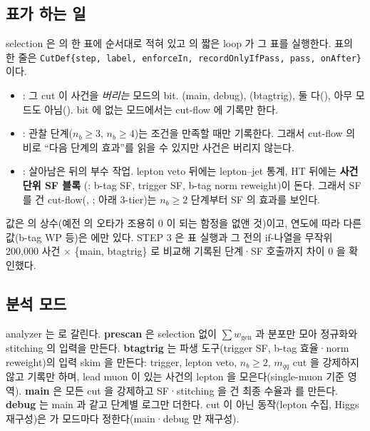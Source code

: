 \subsection{표가 하는 일}
selection 은  의  한 표에 순서대로 적혀 있고  의 짧은 loop 가 그 표를
실행한다. 표의 한 줄은 \texttt{CutDef\{step, label, enforceIn, recordOnlyIfPass, pass, onAfter\}} 이다.
\begin{itemize}
\item {}: 그 cut 이 사건을 \emph{버리는} 모드의 bit. (main, debug), (btagtrig),
      둘 다(), 아무 모드도 아님(). bit 에 없는 모드에서는 cut-flow 에 기록만 한다.
\item {}: 관찰 단계($n_b\ge3$, $n_b\ge4$)는 조건을 만족할 때만 기록한다. 그래서 cut-flow 의 비로 ``다음 단계의 효과''를
      읽을 수 있지만 사건은 버리지 않는다.
\item {}: 살아남은 뒤의 부수 작업. lepton veto 뒤에는 lepton–jet 통계, HT 뒤에는 \textbf{사건 단위 SF 블록}
      (: b-tag SF, trigger SF, b-tag norm reweight)이 돈다. 그래서 SF 를 건 cut-flow(, ; 아래 3-tier)는
      $n_b\ge2$ 단계부터 SF 의 효과를 보인다.
\end{itemize}
값은  의  상수(예전  의 오타가 조용히 0 이 되는 함정을 없앤 것)이고, 연도에 따라
다른 값(b-tag WP 등)은  에만 있다. STEP 3 은 표 실행과 그 전의 if-나열을 무작위 200,000 사건 $\times$
\{main, btagtrig\} 로 비교해 기록된 단계·SF 호출까지 차이 0 을 확인했다.

\subsection{분석 모드}
analyzer 는  로 갈린다. \textbf{prescan} 은 selection 없이 $\sum w_{\text{gen}}$ 과  분포만 모아 정규화와
stitching 의 입력을 만든다. \textbf{btagtrig} 는 파생 도구(trigger SF, b-tag 효율·norm reweight)의 입력 skim 을 만든다: trigger, lepton veto,
$n_b\ge2$, $m_{qq}$ cut 을 강제하지 않고 기록만 하며, lead muon 이 있는 사건의 lepton 을 모은다(single-muon 기준 영역). \textbf{main} 은 모든 cut 을
강제하고 SF·stitching 을 건 최종 수율과  를 만든다. \textbf{debug} 는 main 과 같고 단계별 로그만 더한다.
cut 이 아닌 동작(lepton 수집, Higgs 재구성)은  가 모드마다 정한다(main·debug 만 \chisq{} 재구성).

